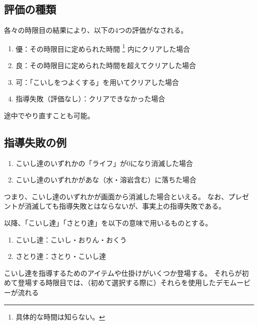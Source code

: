\subsection{評価の種類}
各々の時限目の結果により、以下の4つの評価がなされる。
\begin{enumerate}[label={\sarrow}]
\item 優：その時限目に定められた時間%
\footnote{具体的な時間は知らない。}%
内にクリアした場合
\item 良：その時限目に定められた時間を超えてクリアした場合
\item 可：「こいしをつよくする」を用いてクリアした場合
\item 指導失敗（評価なし）：クリアできなかった場合
\end{enumerate}
途中でやり直すことも可能。


\subsection{指導失敗の例}
\begin{enumerate}[label={\sarrow}]
\item こいし達のいずれかの「ライフ」が0になり消滅した場合
\item こいし達のいずれかがあな（水・溶岩含む）に落ちた場合
\end{enumerate}
つまり、こいし達のいずれかが画面から消滅した場合といえる。
なお、プレゼントが消滅しても指導失敗とはならないが、事実上の指導失敗である。
\begin{marker}
以降、「こいし達」「さとり達」を以下の意味で用いるものとする。
\begin{enumerate}[label={\sarrow}]
\item こいし達：こいし・おりん・おくう
\item さとり達：さとり・こいし達
\end{enumerate}
\end{marker}


\clearpage
こいし達を指導するためのアイテムや仕掛けがいくつか登場する。
それらが初めて登場する時限目では、（初めて選択する際に）それらを使用したデモムービーが流れる



